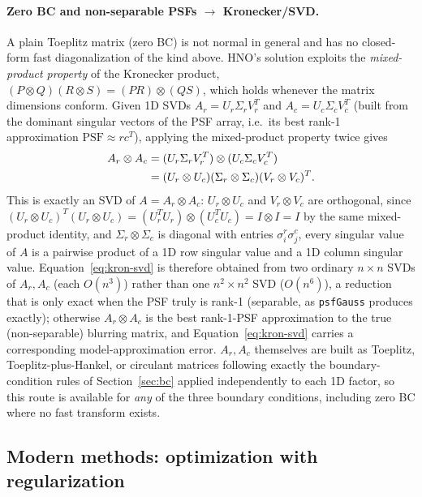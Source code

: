 \documentclass[12pt, a4paper, onecolumn]{article}
\theoremstyle{plain}          %
\theoremstyle{definition}     %
\theoremstyle{remark}
\begin{document}
\paragraph{Zero BC and non-separable PSFs $\to$ Kronecker/SVD.} A plain
Toeplitz matrix (zero BC) is not normal in general and has no closed-form
fast diagonalization of the kind above. HNO's solution exploits the
\emph{mixed-product property} of the Kronecker product,
$(P\otimes Q)(R\otimes S) = (PR)\otimes(QS)$, which holds whenever the
matrix dimensions conform. Given 1D SVDs $A_r=U_r\Sigma_rV_r^T$ and
$A_c=U_c\Sigma_cV_c^T$ (built from the dominant singular vectors of the
PSF array, i.e.\ its best rank-1 approximation $\text{PSF}\approx rc^T$),
applying the mixed-product property twice gives
\begin{align}
    A_r\otimes A_c
    &= (U_r\Sigma_rV_r^T)\otimes(U_c\Sigma_cV_c^T) \notag\\
    &= (U_r\otimes U_c)(\Sigma_r\otimes\Sigma_c)(V_r\otimes V_c)^T.
    \label{eq:kron-svd}
\end{align}
This is exactly an SVD of $A=A_r\otimes A_c$: $U_r\otimes U_c$ and
$V_r\otimes V_c$ are orthogonal, since
$(U_r\otimes U_c)^T(U_r\otimes U_c) = (U_r^TU_r)\otimes(U_c^TU_c)=I\otimes I=I$
by the same mixed-product identity, and $\Sigma_r\otimes\Sigma_c$ is
diagonal with entries $\sigma_i^r\sigma_j^c$, every singular value of
$A$ is a pairwise product of a 1D row singular value and a 1D column
singular value. Equation~\eqref{eq:kron-svd} is therefore obtained from
two ordinary $n\times n$ SVDs of $A_r,A_c$ (each $O(n^3)$) rather than one
$n^2\times n^2$ SVD ($O(n^6)$), a reduction that is only exact when the
PSF truly is rank-1 (separable, as \texttt{psfGauss} produces exactly);
otherwise $A_r\otimes A_c$ is the best rank-1-PSF approximation to the
true (non-separable) blurring matrix, and Equation~\eqref{eq:kron-svd}
carries a corresponding model-approximation error. $A_r,A_c$ themselves
are built as Toeplitz, Toeplitz-plus-Hankel, or circulant matrices
following exactly the boundary-condition rules of Section~\ref{sec:bc}
applied independently to each 1D factor, so this route is available for
\emph{any} of the three boundary conditions, including zero BC where no
fast transform exists.

\subsection{Modern methods: optimization with regularization}
\label{sec:modern}
\end{document}
